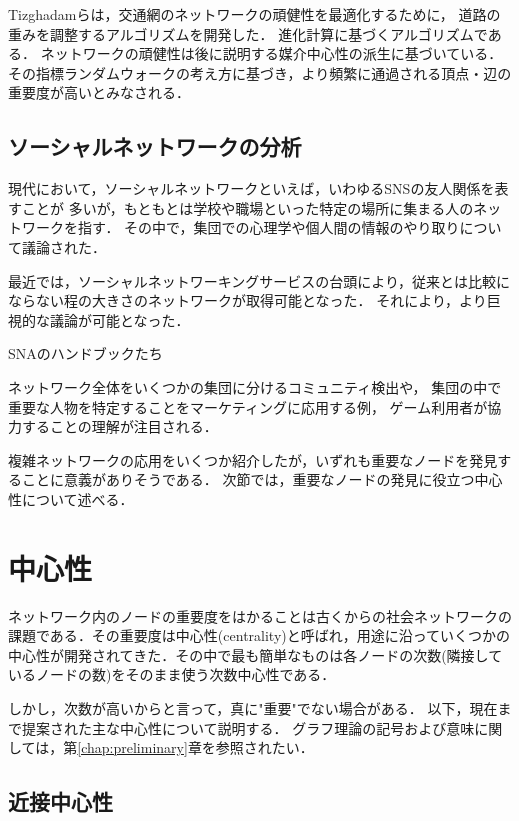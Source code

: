 Tizghadamらは，交通網のネットワークの頑健性を最適化するために，
道路の重みを調整するアルゴリズムを開発した\cite{Tizghadam2010}．
進化計算に基づくアルゴリズムである．
ネットワークの頑健性は後に説明する媒介中心性の派生に基づいている．
その指標ランダムウォークの考え方に基づき，より頻繁に通過される頂点・辺の重要度が高いとみなされる．

\subsection{ソーシャルネットワークの分析}

現代において，ソーシャルネットワークといえば，いわゆるSNSの友人関係を表すことが
多いが，もともとは学校や職場といった特定の場所に集まる人のネットワークを指す．
その中で，集団での心理学\cite{Moreno1978}や個人間の情報のやり取り\cite{Christie1952}について議論された．

最近では，ソーシャルネットワーキングサービスの台頭により，従来とは比較にならない程の大きさのネットワークが取得可能となった．
それにより，より巨視的な議論が可能となった．

SNAのハンドブックたち\cite{Pappi2006,Butts2008}

ネットワーク全体をいくつかの集団に分けるコミュニティ検出\cite{Fortunato2010,Leskovec2010}や，
集団の中で重要な人物を特定することをマーケティングに応用する例\cite{Kempe2015}，
ゲーム利用者が協力することの理解\cite{Szell2010,Rand2011}が注目される．

複雑ネットワークの応用をいくつか紹介したが，いずれも重要なノードを発見することに意義がありそうである．
次節では，重要なノードの発見に役立つ中心性について述べる．

\section{中心性}
\label{sect:centrality}

ネットワーク内のノードの重要度をはかることは古くからの社会ネットワークの課題である\cite{Christie1952,Ibarra1993}．その重要度は中心性(centrality)と呼ばれ，用途に沿っていくつかの中心性が開発されてきた．その中で最も簡単なものは各ノードの次数(隣接しているノードの数)をそのまま使う次数中心性である．

しかし，次数が高いからと言って，真に"重要"でない場合がある．
以下，現在まで提案された主な中心性について説明する．
グラフ理論の記号および意味に関しては，第\ref{chap:preliminary}章を参照されたい．

\subsection{近接中心性}
\label{subsect:closeness}

